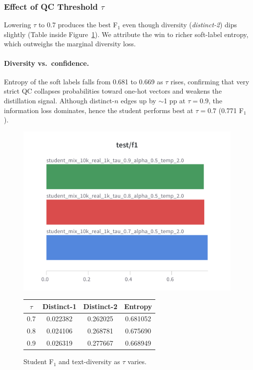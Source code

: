 \documentclass[11pt]{article}
\begin{document}
\subsubsection{Effect of QC Threshold $\tau$}
\label{sec:tau}
Lowering $\tau$ to 0.7 produces the best F$_1$ even though diversity
(\emph{distinct-2}) dips slightly (Table inside
Figure~\ref{fig:tau}).  We attribute the win to richer soft-label
entropy, which outweighs the marginal diversity loss.

\paragraph{Diversity vs.\ confidence.}
Entropy of the soft labels falls from 0.681 to 0.669 as $\tau$ rises,
confirming that very strict QC collapses probabilities toward one-hot
vectors and weakens the distillation signal.  Although distinct-$n$
edges up by $\sim$1 pp at $\tau=0.9$, the information loss dominates,
hence the student performs best at $\tau=0.7$ (0.771 F$_1$).

\begin{figure}[htbp]
  \centering
  \begin{minipage}
    {0.60\textwidth}
    \includegraphics[width=\linewidth]{figures/student_qc_f1.png}
  \end{minipage}
  \begin{minipage}
    {0.60\textwidth}
    \centering
    \begin{tabular}{cccc}
      \toprule
      \textbf{$\tau$} & \textbf{Distinct-1} & \textbf{Distinct-2} &
      \textbf{Entropy} \\
      \midrule
      0.7 & 0.022382 & 0.262025 & 0.681052 \\
      0.8 & 0.024106 & 0.268781 & 0.675690 \\
      0.9 & 0.026319 & 0.277667 & 0.668949 \\
      \bottomrule
    \end{tabular}
  \end{minipage}
  \caption{Student F$_1$ and text-diversity as $\tau$ varies.}
  \label{fig:tau}
\end{figure}
\end{document}
